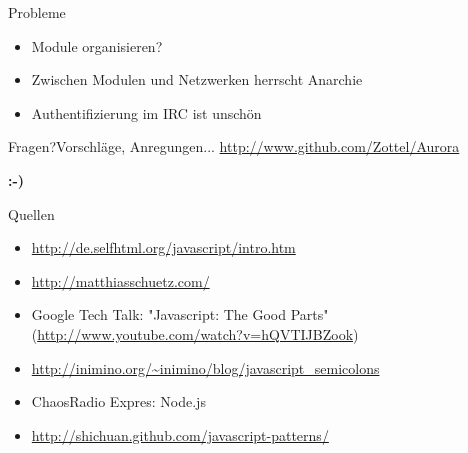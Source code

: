 \documentclass{beamer}
\begin{document}
		\begin{frame}{Probleme}
			\begin{itemize}
				\item Module organisieren?
				\item Zwischen Modulen und Netzwerken herrscht Anarchie
				\item Authentifizierung im IRC ist unschön
			\end{itemize}
		\end{frame}

		\begin{frame}{Fragen?}{Vorschläge, Anregungen...}
			\url{http://www.github.com/Zottel/Aurora}

			\textbf{:-)}
		\end{frame}

		\begin{frame}{Quellen}
			\begin{itemize}
				\item \url{http://de.selfhtml.org/javascript/intro.htm}
				\item \url{http://matthiasschuetz.com/}
				\item Google Tech Talk: "Javascript: The Good Parts"
					(\url{http://www.youtube.com/watch?v=hQVTIJBZook})
				\item \url{http://inimino.org/~inimino/blog/javascript_semicolons}
				\item ChaosRadio Expres: Node.js
				\item \url{http://shichuan.github.com/javascript-patterns/}
			\end{itemize}
		\end{frame}
		
\end{document}
